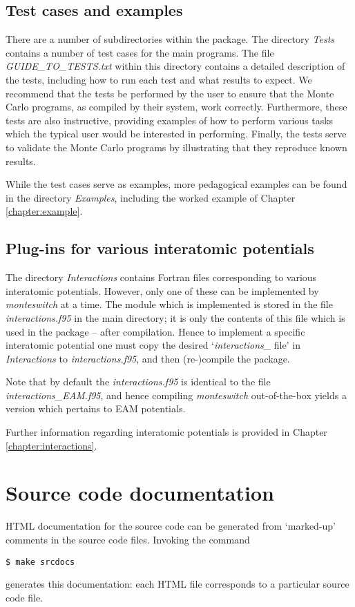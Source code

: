 \documentclass{report}
\begin{document}
\subsection{Test cases and examples}
There are a number of subdirectories within the package. The directory \emph{Tests} contains a number of test cases for the main programs. The file
\emph{GUIDE\_TO\_TESTS.txt} within this directory contains a detailed description of the tests, including how to run each test and what results 
to expect. We recommend that the tests be performed by the user to ensure that the Monte Carlo programs, as compiled by their system, work
correctly. Furthermore, these tests are also instructive, providing examples of how to perform various tasks which the typical user would be 
interested in performing. Finally, the tests serve to validate the Monte Carlo programs by illustrating that they reproduce known results.

While the test cases serve as examples, more pedagogical examples can be found in the directory \emph{Examples}, including the worked example
of Chapter \ref{chapter:example}.

\subsection{Plug-ins for various interatomic potentials}
The directory \emph{Interactions} contains Fortran files corresponding to various interatomic potentials. However, only one of these can be implemented 
by \emph{monteswitch} at a time. The module which is implemented is stored in the file \emph{interactions.f95} in the main directory; it is only the 
contents of this file which is used in the package -- after compilation. Hence to implement a specific interatomic potential one must copy
the desired `\emph{interactions\_} file' in \emph{Interactions} to \emph{interactions.f95}, and then (re-)compile the package.

Note that by default the \emph{interactions.f95} is identical to the file \emph{interactions\_EAM.f95}, and hence compiling \emph{monteswitch}
out-of-the-box yields a version which pertains to EAM potentials.

Further information regarding interatomic potentials is provided in Chapter \ref{chapter:interactions}.

\section{Source code documentation}
HTML documentation for the source code can be generated from `marked-up' comments in the source code files. Invoking the command 
\begin{verbatim}
$ make srcdocs
\end{verbatim}
generates this documentation: each HTML file corresponds to a particular source code file.
\end{document}
